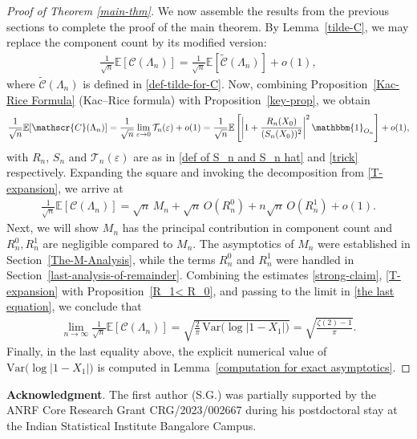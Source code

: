 \documentclass[9pt,a4paper,reqno]{amsart}
\theoremstyle{mine}
\theoremstyle{definition}
\theoremstyle{remark}
\renewcommand\epsilon{\varepsilon}
\begin{document}
\begin{proof}[Proof of Theorem \ref{main-thm}]We now assemble the results from the previous sections to complete the proof of the main theorem. 
By Lemma~\ref{tilde-C}, we may replace the component count by its modified version:
\begin{align*}
    \frac{1}{\sqrt{n}}\mathbb{E}[\mathscr{C}(\Lambda_n)]
    =
    \frac{1}{\sqrt{n}}\mathbb{E}[\widetilde{\mathscr{C}}(\Lambda_n)]
    + o(1),
\end{align*}
where $\widetilde{\mathscr{C}}(\Lambda_n)$ is defined in \eqref{def-tilde-for-C}. Now, combining Proposition~\ref{Kac-Rice Formula} (Kac--Rice formula) with Proposition~\ref{key-prop}, we obtain
\begin{align*}
    \frac{1}{\sqrt{n}}\mathbb{E}[\mathscr{C}(\Lambda_n)]
    =
    \frac{1}{\sqrt{n}} \lim_{\epsilon \to 0} \mathcal{T}_n(\epsilon) + o(1)
    =
    \frac{1}{\sqrt{n}}\mathbb{E}\left[
        \left| 1 + \frac{R_n(X_0)}{(S_n(X_0))^2} \right|^2
        \mathbbm{1}_{O_n}
    \right]
    + o(1),
\end{align*}
with $R_n$, $S_n$ and $\mathcal{T}_n(\epsilon)$ are as in \eqref{def of S_n and S_n hat} and \eqref{trick} respectively. Expanding the square and invoking the decomposition from \eqref{T-expansion}, we arrive at
\begin{align}\label{the last equation}
    \frac{1}{\sqrt{n}}\mathbb{E}[\mathscr{C}(\Lambda_n)]
    =
    \sqrt{n}\,M_n
    +
    \sqrt{n}\,O(R_n^0)
    +
    n\sqrt{n}\,O(R_n^1)
    +
    o(1).
\end{align}
Next, we will show $M_n$ has the principal contribution in component count and $R_n^0, R_n^1$ are negligible compared to $M_n$. The asymptotics of $M_n$ were established in Section~\ref{The-M-Analysis}, while the terms $R_n^0$ and $ R_n^1$ were handled in Section~\ref{last-analysis-of-remainder}. Combining the estimates \eqref{strong-claim}, \eqref{T-expansion} with  Proposition~\ref{R_1< R_0}, and passing to the limit in \eqref{the last equation}, we conclude that
\begin{align*}
    \lim_{n \to \infty}
    \frac{1}{\sqrt{n}}\mathbb{E}[\mathscr{C}(\Lambda_n)]
    =
    \sqrt{\frac{2}{\pi}\,\mathrm{Var}\bigl(\log|1 - X_1|\bigr)}
    =
    \sqrt{\frac{\zeta(2) - 1}{\pi}}.
\end{align*}
Finally, in the last equality above, the explicit numerical value of $\mathrm{Var}\bigl(\log|1 - X_1|\bigr)$ is computed in Lemma~\ref{computation for exact asymptotics}.
\end{proof}

\textbf{Acknowledgment}. The first author (S.G.) was partially supported by the ANRF Core Research Grant CRG/2023/002667 during his postdoctoral stay at the Indian Statistical Institute Bangalore Campus.



\end{document}
